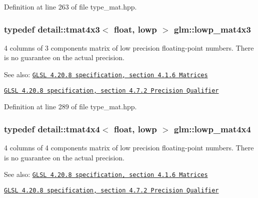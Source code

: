 Definition at line 263 of file type\_\-mat.hpp.\hypertarget{group__core__precision_gda92d0baf15002240dd6f638c57f9fec}{
\subsubsection[lowp\_\-mat4x3]{\setlength{\rightskip}{0pt plus 5cm}typedef detail::tmat4x3$<$ float, lowp $>$ {\bf glm::lowp\_\-mat4x3}}}
\label{group__core__precision_gda92d0baf15002240dd6f638c57f9fec}


4 columns of 3 components matrix of low precision floating-point numbers. There is no guarantee on the actual precision.

\begin{Desc}
\item[See also:]\href{http://www.opengl.org/registry/doc/GLSLangSpec.4.20.8.pdf}{\tt GLSL 4.20.8 specification, section 4.1.6 Matrices} 

\href{http://www.opengl.org/registry/doc/GLSLangSpec.4.20.8.pdf}{\tt GLSL 4.20.8 specification, section 4.7.2 Precision Qualifier} \end{Desc}


Definition at line 289 of file type\_\-mat.hpp.\hypertarget{group__core__precision_gd31846a0565c22a0479950313c28b218}{
\subsubsection[lowp\_\-mat4x4]{\setlength{\rightskip}{0pt plus 5cm}typedef detail::tmat4x4$<$ float, lowp $>$ {\bf glm::lowp\_\-mat4x4}}}
\label{group__core__precision_gd31846a0565c22a0479950313c28b218}


4 columns of 4 components matrix of low precision floating-point numbers. There is no guarantee on the actual precision.

\begin{Desc}
\item[See also:]\href{http://www.opengl.org/registry/doc/GLSLangSpec.4.20.8.pdf}{\tt GLSL 4.20.8 specification, section 4.1.6 Matrices} 

\href{http://www.opengl.org/registry/doc/GLSLangSpec.4.20.8.pdf}{\tt GLSL 4.20.8 specification, section 4.7.2 Precision Qualifier} \end{Desc}


